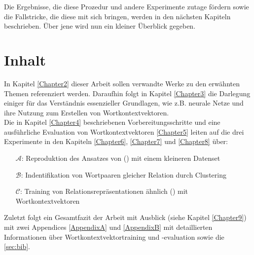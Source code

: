 Die Ergebnisse, die diese Prozedur und andere Experimente zutage fördern sowie die Fallstricke, die diese mit sich
bringen, werden in den nächsten Kapiteln beschrieben. Über jene wird nun ein kleiner Überblick gegeben.

\section{Inhalt}

In Kapitel \ref{Chapter2} dieser Arbeit sollen verwandte Werke zu den erwähnten Themen referenziert werden.
Daraufhin folgt in Kapitel \ref{Chapter3} die Darlegung einiger für das Verständnis essenzieller Grundlagen, wie z.B.
neurale Netze und ihre Nutzung zum Erstellen von Wortkontextvektoren.\\
Die in Kapitel \ref{Chapter4} beschriebenen Vorbereitungsschritte und eine ausführliche Evaluation von Wortkontextvektoren
\ref{Chapter5} leiten auf die drei Experimente in den Kapiteln \ref{Chapter6}, \ref{Chapter7} und \ref{Chapter8} über:
\begin{itemize}
  \item[$\mathcal{A}$:] Reproduktion des Ansatzes von (\cite{bordes2013translating}) mit einem kleineren Datenset
  \item[$\mathcal{B}$:] Indentifikation von Wortpaaren gleicher Relation durch Clustering
  \item[$\mathcal{C}$:] Training von Relationsrepräsentationen ähnlich (\cite{bordes2013translating}) mit Wortkontextvektoren
\end{itemize}

Zuletzt folgt ein Gesamtfazit der Arbeit mit Ausblick (siehe Kapitel \ref{Chapter9}) mit zwei Appendices \ref{AppendixA}
und \ref{AppendixB} mit detaillierten Informationen über Wortkontextvektortraining und -evaluation sowie die
\ref{sec:bib}.
